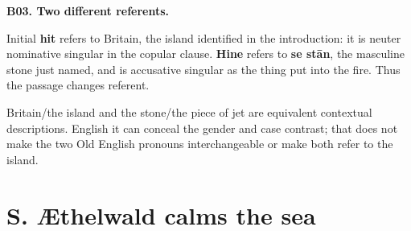 \par\begin{minipage}{\linewidth}\raggedright
\textbf{B03. Two different referents.}

Initial \textbf{hit} refers to Britain, the island identified in the introduction: it is neuter nominative singular in the copular clause. \textbf{Hine} refers to \textbf{se stān}, the masculine stone just named, and is accusative singular as the thing put into the fire. Thus the passage changes referent.

Britain/\allowbreak{}the island and the stone/\allowbreak{}the piece of jet are equivalent contextual descriptions. English it can conceal the gender and case contrast; that does not make the two Old English pronouns interchangeable or make both refer to the island.

\end{minipage}\par\addvspace{4pt}

\clearpage
\section*{S. Æthelwald calms the sea}

